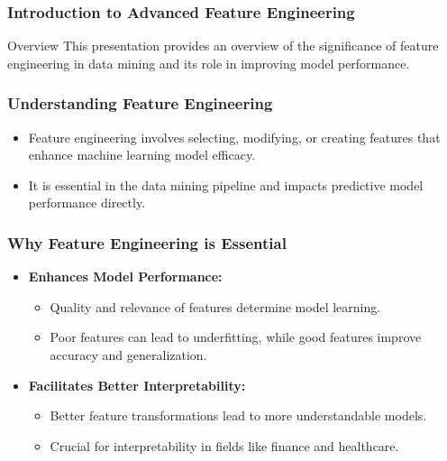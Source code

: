\documentclass[aspectratio=169]{beamer}
\begin{document}
\frame{\titlepage}

\begin{frame}[fragile]
    \frametitle{Introduction to Advanced Feature Engineering}
    \begin{block}{Overview}
        This presentation provides an overview of the significance of feature engineering in data mining and its role in improving model performance.
    \end{block}
\end{frame}

\begin{frame}[fragile]
    \frametitle{Understanding Feature Engineering}
    \begin{itemize}
        \item Feature engineering involves selecting, modifying, or creating features that enhance machine learning model efficacy.
        \item It is essential in the data mining pipeline and impacts predictive model performance directly.
    \end{itemize}
\end{frame}

\begin{frame}[fragile]
    \frametitle{Why Feature Engineering is Essential}
    \begin{itemize}
        \item \textbf{Enhances Model Performance:} 
        \begin{itemize}
            \item Quality and relevance of features determine model learning.
            \item Poor features can lead to underfitting, while good features improve accuracy and generalization.
        \end{itemize}
        
        \item \textbf{Facilitates Better Interpretability:} 
        \begin{itemize}
            \item Better feature transformations lead to more understandable models.
            \item Crucial for interpretability in fields like finance and healthcare.
        \end{itemize}
    \end{itemize}
\end{frame}
\end{document}
